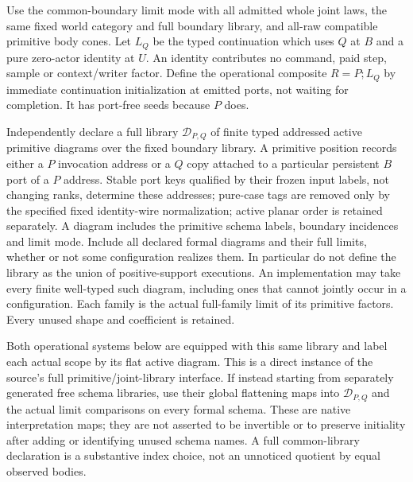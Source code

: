 \documentclass[11pt]{article}
\begin{document}
Use the common-boundary limit mode with all admitted whole joint laws, the same fixed world category and full boundary library, and all-raw compatible primitive body cones. Let $L_Q$ be the typed continuation which uses $Q$ at $B$ and a pure zero-actor identity at $U$. An identity contributes no command, paid step, sample or context/writer factor. Define the operational composite $R=P;L_Q$ by immediate continuation initialization at emitted ports, not waiting for completion. It has port-free seeds because $P$ does.

Independently declare a full library $\mathscr D_{P,Q}$ of finite typed addressed active primitive diagrams over the fixed boundary library. A primitive position records either a $P$ invocation address or a $Q$ copy attached to a particular persistent $B$ port of a $P$ address. Stable port keys qualified by their frozen input labels, not changing ranks, determine these addresses; pure-case tags are removed only by the specified fixed identity-wire normalization; active planar order is retained separately. A diagram includes the primitive schema labels, boundary incidences and limit mode. Include all declared formal diagrams and their full limits, whether or not some configuration realizes them. In particular do not define the library as the union of positive-support executions. An implementation may take every finite well-typed such diagram, including ones that cannot jointly occur in a configuration. Each family is the actual full-family limit of its primitive factors. Every unused shape and coefficient is retained.

Both operational systems below are equipped with this same library and label each actual scope by its flat active diagram. This is a direct instance of the source's full primitive/joint-library interface. If instead starting from separately generated free schema libraries, use their global flattening maps into $\mathscr D_{P,Q}$ and the actual limit comparisons on every formal schema. These are native interpretation maps; they are not asserted to be invertible or to preserve initiality after adding or identifying unused schema names. A full common-library declaration is a substantive index choice, not an unnoticed quotient by equal observed bodies.
\end{document}
